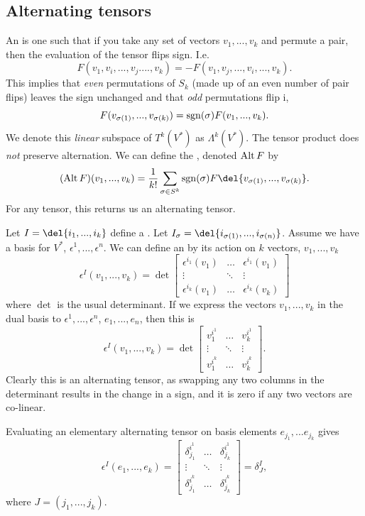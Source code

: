 \subsection{Alternating tensors}
\label{sec:alternating_tensors}
An  is one such that if you take any set of vectors \(v_1, .
.., v_k\) and permute a pair, then the evaluation of the tensor flips sign.
I.e. \[F(v_1, v_i, .
	.., v_j ...., v_k) = -F(v_1,v_j, ..., v_i, ..., v_k).\]
This implies that \emph{even} permutations of \(S_k\) (made up of an even number of pair flips) leaves the sign unchanged and that \emph{odd} permutations flip i, \[F(v_{\sigma(1)}, .
	.., v_{\sigma(k)}) = \operatorname{sgn}(\sigma) F(v_1, ..., v_k).\]
We denote this \emph{linear} subspace of \(T^k(V^*)\) as \(\Lambda^k(V^*)\).
The tensor product does \emph{not} preserve alternation.
We can define the , denoted \(\operatorname{Alt} F\) by \[(\alt F) (v_1, .
	.., v_k)  =\frac{1}{k!}\sum_{\sigma \in S^k} \sign(\sigma) F\del{v_{\sigma(1)}, ..., v_{\sigma(k)}}.\]
For any tensor, this returns us an alternating tensor.

Let \(I = \del{i_1, ..., i_k}\) define a .
Let \(I_\sigma = \del{i_{\sigma(1)}, ..., i_{\sigma(n)}}\).
Assume we have a basis for \(V^*\), \(\epsilon^1, ..., \epsilon^n\).
We can define an  by its action on \(k\) vectors, \(v_1, ..., v_k\) 
\[\epsilon^I (v_1, ..., v_k) = \det \begin{bmatrix}
	\epsilon^{i_1}(v_1) & \dots & \epsilon^{i_1}(v_1)\\
	\vdots & \ddots & \vdots \\
	\epsilon^{i_k}(v_1) & \dots & \epsilon^{i_k}(v_k)
\end{bmatrix} 
\] where \(\det\) is the usual determinant. 
If we express the vectors \(v_1, ..., v_k\) in the dual basis to \(\epsilon^1, ..., \epsilon^n\), \(e_1, ..., e_n\), then this is 
\[\epsilon^I (v_1, ..., v_k) = \det \begin{bmatrix}
	v_1^{i^1} & \dots & v_k^{i^1}\\
	\vdots & \ddots & \vdots \\
	v_1^{i^k} & \dots & v_k^{i^k}
\end{bmatrix} 
.\]
Clearly this is an alternating tensor, as swapping any two columns in the determinant results in the change in a sign, and it is zero if any two vectors are co-linear.

Evaluating an elementary alternating tensor on basis elements \(e_{j_1}, ... e_{j_k}\) gives 
\[\epsilon^I(e_1, ..., e_k) = \begin{bmatrix}
	\delta_{j_1}^{i^1} & \dots &\delta_{j_k}^{i^1}\\
	\vdots & \ddots & \vdots \\
	\delta_{j_1}^{i^k} & \dots & \delta_{j_k}^{i^k}
\end{bmatrix} = \delta_J^I,\] where \(J=(j_1, ..., j_k)\).

